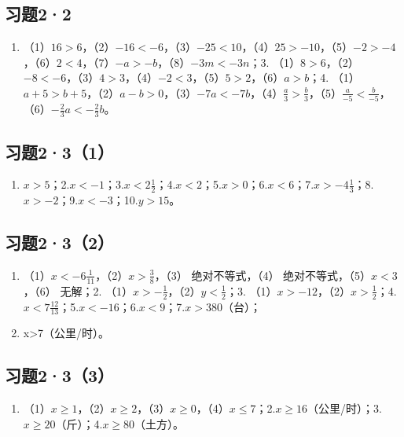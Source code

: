 \subsection{习题2·2}

\begin{enumerate}[start=2]
\item
  （1）\(16 > 6\)，（2）\(-16 < -6\)，（3）\(-25 < 10\)，（4）\(25 > -10\)，（5）\(-2 > -4\)，（6）\(2 < 4\)，（7）\(-a > -b\)，（8）\(-3m < -3n\)；3.
  （1）\(8 > 6\)，（2）\(-8 < -6\)，（3）\(4 > 3\)，（4）\(-2 < 3\)，（5）\(5 > 2\)，（6）\(a > b\)；4.
  （1）\(a + 5 > b + 5\)，（2）\(a - b > 0\)，（3）\(-7a < -7b\)，（4）\(\frac{a}{3} > \frac{b}{3}\)，（5）\(\frac{a}{-5} < \frac{b}{-5}\)，（6）\(-\frac{2}{3} a < -\frac{2}{3} b\)。
\end{enumerate}

\subsection{习题2·3（1）}

\begin{enumerate}[start=1]
\item
  \(x > 5\)；2.\(x < -1\)；3.\(x < 2\frac{1}{2}\)；4.\(x < 2\)；5.\(x > 0\)；6.\(x < 6\)；7.\(x > -4\frac{1}{3}\)；8.\(x > -2\)；9.\(x < -3\)；10.\(y > 15\)。
\end{enumerate}

\subsection{习题2·3（2）}

\begin{enumerate}
\item
  （1）\(x < -6\frac{1}{11}\)，（2）\(x > \frac{3}{8}\)，（3）
  绝对不等式，（4） 绝对不等式，（5）\(x < 3\)，（6） 无解；2.
  （1）\(x > -\frac{1}{2}\)，（2）\(y < \frac{1}{2}\)；3.
  （1）\(x > -12\)，（2）\(x > \frac{1}{2}\)；4.\(x < 7\frac{12}{13}\)；5.\(x < -16\)；6.\(x < 9\)；7.\(x > 380\)（台）；
\item
  x\textgreater7（公里/时）。
\end{enumerate}

\subsection{习题2·3（3）}

\begin{enumerate}
\item
  （1）\(x \geqslant 1\)，（2）\(x \geqslant 2\)，（3）\(x \geqslant 0\)，（4）\(x \leqslant 7\)；2.\(x \geqslant 16\)（公里/时）；3.\(x \geqslant 20\)（斤）；4.\(x \geqslant 80\)（土方）。
\end{enumerate}

